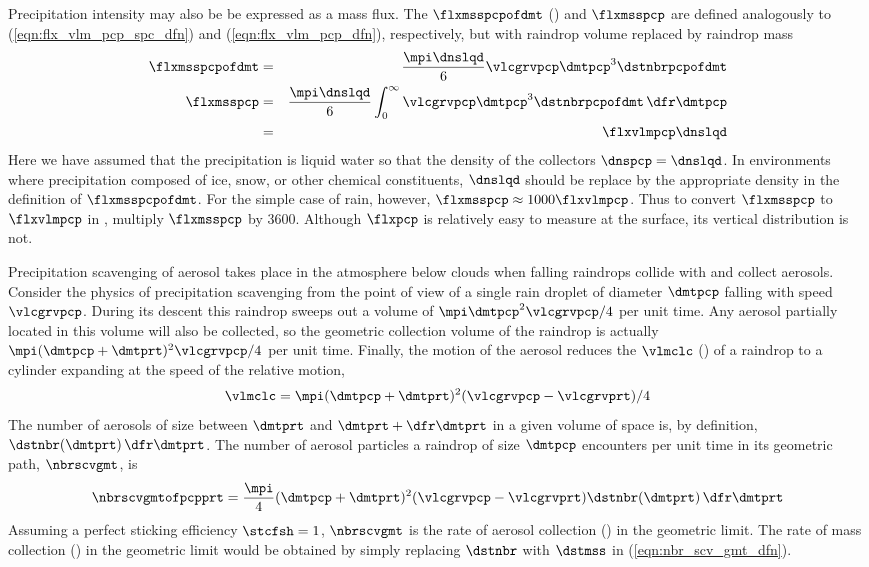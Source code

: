 \documentclass[12pt,twoside]{book}
\begin{document}
Precipitation intensity may also be be expressed as a mass flux.
The  $\flxmsspcpofdmt$ 
(\kgxmSsm) and  $\flxmsspcp$ are
defined analogously to (\ref{eqn:flx_vlm_pcp_spc_dfn}) and
(\ref{eqn:flx_vlm_pcp_dfn}), respectively, but with raindrop volume
replaced by raindrop mass 
\begin{eqnarray}
\label{eqn:flx_mss_pcp_spc_dfn}
\flxmsspcpofdmt & = & \frac{\mpi \dnslqd}{6} \vlcgrvpcp \dmtpcp^{3}
\dstnbrpcpofdmt \\
\label{eqn:flx_mss_pcp_dfn}
\flxmsspcp & = & \frac{\mpi \dnslqd}{6}
\int_{0}^{\infty} \vlcgrvpcp \dmtpcp^{3} \dstnbrpcpofdmt \,\dfr\dmtpcp \\
\label{eqn:flx_mss_pcp_vlm_dfn}
& = & \flxvlmpcp \dnslqd
\end{eqnarray}
Here we have assumed that the precipitation is liquid water so that
the density of the collectors $\dnspcp = \dnslqd$.
In environments where precipitation composed of ice, snow, or other
chemical constituents, $\dnslqd$ should be replace by the appropriate
density in the definition of $\flxmsspcpofdmt$.
For the simple case of rain, however, 
$\flxmsspcp \approx 1000 \flxvlmpcp$.  
Thus to convert $\flxmsspcp$ to $\flxvlmpcp$ in \mmxhr, multiply
$\flxmsspcp$ by $3600$.  
Although $\flxpcp$ is relatively easy to measure at the surface,
its vertical distribution is not.

Precipitation scavenging of aerosol takes place in the atmosphere
below clouds when falling raindrops collide with and collect aerosols.
Consider the physics of precipitation scavenging from the point of
view of a single rain droplet of diameter $\dmtpcp$ falling with speed
$\vlcgrvpcp$. 
During its descent this raindrop sweeps out a volume of 
$\mpi \dmtpcp^{2} \vlcgrvpcp / 4$ 
per unit time.
Any aerosol partially located in this volume will also be collected,
so the geometric collection volume of the raindrop is actually
$\mpi ( \dmtpcp + \dmtprt )^{2} \vlcgrvpcp / 4$ 
per unit time.
Finally, the motion of the aerosol reduces the  $\vlmclc$ (\mCxs) of a raindrop to a cylinder expanding at the
speed of the relative motion, 
\begin{eqnarray}
\vlmclc = \mpi ( \dmtpcp + \dmtprt )^{2} (\vlcgrvpcp - \vlcgrvprt) / 4
\label{eqn:clc_vlm_gmt}
\end{eqnarray}
The number of aerosols of size between $\dmtprt$ and $\dmtprt +
\dfr\dmtprt$ in a given volume of space is, by definition, 
$\dstnbr(\dmtprt) \,\dfr\dmtprt$.
The number of aerosol particles a raindrop of size $\dmtpcp$
encounters per unit time in its geometric path, $\nbrscvgmt$, is
\begin{equation}
\nbrscvgmtofpcpprt = \frac{\mpi}{4} ( \dmtpcp + \dmtprt )^{2} (\vlcgrvpcp -
\vlcgrvprt) \dstnbr(\dmtprt) \,\dfr\dmtprt
\label{eqn:nbr_scv_gmt_dfn}
\end{equation}
Assuming a perfect sticking efficiency $\stcfsh = 1$, $\nbrscvgmt$ is
the rate of aerosol collection (\nxmCs) in the geometric limit.
The rate of mass collection (\kgxmCs) in the geometric limit would be
obtained by simply replacing $\dstnbr$ with $\dstmss$ in
(\ref{eqn:nbr_scv_gmt_dfn}).  
\end{document}
